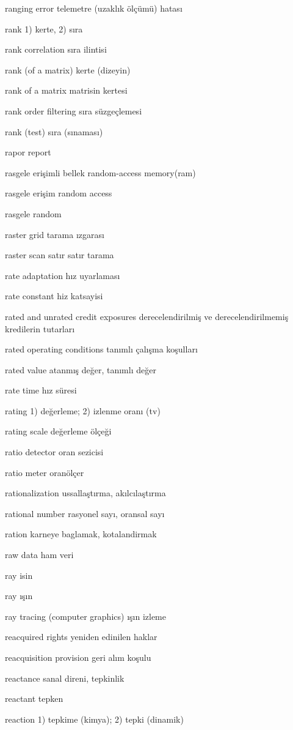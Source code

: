 \documentclass[12pt,fleqn]{article}\usepackage{../../common}
\begin{document}
ranging error telemetre (uzaklık ölçümü) hatası

rank 1) kerte, 2) sıra

rank correlation sıra ilintisi

rank (of a matrix) kerte (dizeyin)

rank of a matrix matrisin kertesi

rank order filtering sıra süzgeçlemesi

rank (test) sıra (sınaması)

rapor report

rasgele erişimli bellek random-access memory(ram)

rasgele erişim random access

rasgele random

raster grid tarama ızgarası

raster scan satır satır tarama

rate adaptation hız uyarlaması

rate constant hiz katsayisi

rated and unrated credit exposures derecelendirilmiş ve derecelendirilmemiş kredilerin tutarları

rated operating conditions tanımlı çalışma koşulları

rated value atanmış değer, tanımlı değer

rate time hız süresi

rating 1) değerleme; 2) izlenme oranı (tv)

rating scale değerleme ölçeği

ratio detector oran sezicisi

ratio meter oranölçer

rationalization ussallaştırma, akılcılaştırma\

rational number rasyonel sayı, oransal sayı

ration karneye baglamak, kotalandirmak

raw data ham veri

ray isin

ray ışın

ray tracing (computer graphics) ışın izleme

reacquired rights yeniden edinilen haklar

reacquisition provision geri alım koşulu

reactance sanal direni, tepkinlik

reactant tepken

reaction 1) tepkime (kimya); 2) tepki (dinamik)
\end{document}
